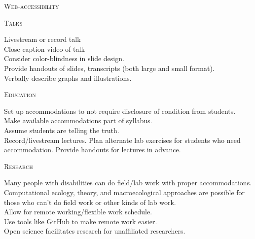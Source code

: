 \documentclass{beamer}
\begin{document}
\begin{center}
\begin{minipage}{0.42\linewidth}
\begin{Large}
\textsc{Web-accessibility\\}
\end{Large}
\begin{Large}
\textsc{Talks\\}
\end{Large}
Livestream or record talk\\
Close caption video of talk\\
Consider color-blindness in slide design.\\
Provide handouts of slides, transcripts (both large and small format).\\
Verbally describe graphs and illustrations.\\

\begin{Large}
\textsc{Education\\}
\end{Large}
Set up accommodations to not require disclosure of condition from students.\\
Make available accommodations part of syllabus.\\
Assume students are telling the truth.\\
Record/livestream lectures.
Plan alternate lab exercises for students who need accommodation.
Provide handouts for lectures in advance.\\

\begin{Large}
\textsc{Research\\}
\end{Large}
Many people with disabilities can do field/lab work with proper accommodations.\\
Computational ecology, theory, and macroecological approaches are possible for those who can't do field work or other kinds of lab work.\\
Allow for remote working/flexible work schedule.\\
Use tools like GitHub to make remote work easier.\\
Open science facilitates research for unaffiliated researchers.\\


\end{minipage}
\end{center}
\end{document}
